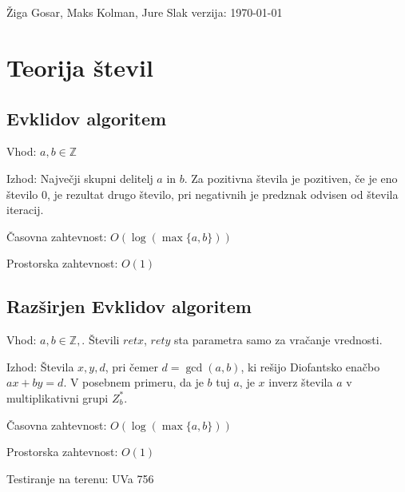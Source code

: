 \documentclass[a4paper,oneside,12pt]{article}
\title{\mytitle}
\author{Jure Slak}
\date{\today}
\def\Z{\mathbb{Z}}
\newenvironment{description*}%
{
\begin{description}
\setlength{\itemsep}{0pt}
\setlength{\parskip}{2pt}
}
{\end{description}}
\begin{document}
\thispagestyle{empty}

\vspace*{\fill}
\begin{center}
  \\[6ex]
  \\[4ex]
  Žiga Gosar, Maks Kolman, Jure Slak
  \vfill
  verzija: \today
\end{center}

\newpage

\tableofcontents

\newpage

\section{Teorija števil}
\label{sec:ts}

\subsection{Evklidov algoritem}
\label{sec:ts:evk}

\begin{description*}
  \item[Vhod:] $a, b \in \Z$
  \item[Izhod:] Največji skupni delitelj $a$ in $b$. Za pozitivna števila je
    pozitiven, če je eno število 0, je rezultat drugo število, pri negativnih je
    predznak odvisen od števila iteracij.
  \item[Časovna zahtevnost:] $O(\log(\max\{a, b\}))$
  \item[Prostorska zahtevnost:] $O(1)$
\end{description*}

\subsection{Razširjen Evklidov algoritem}
\label{sec:ts:extevk}
\begin{description*}
  \item[Vhod:] $a, b \in \Z,$. Števili $retx$, $rety$ sta parametra samo za vračanje vrednosti.
  \item[Izhod:] Števila $x, y, d$, pri čemer $d = \gcd(a, b)$, ki rešijo
    Diofantsko enačbo $ax + by = d$. V posebnem primeru, da je $b$ tuj $a$, je
    $x$ inverz števila $a$ v multiplikativni grupi $Z_b^\ast$.
  \item[Časovna zahtevnost:] $O(\log(\max\{a, b\}))$
  \item[Prostorska zahtevnost:] $O(1)$
  \item[Testiranje na terenu:] UVa 756
\end{description*}
\end{document}

